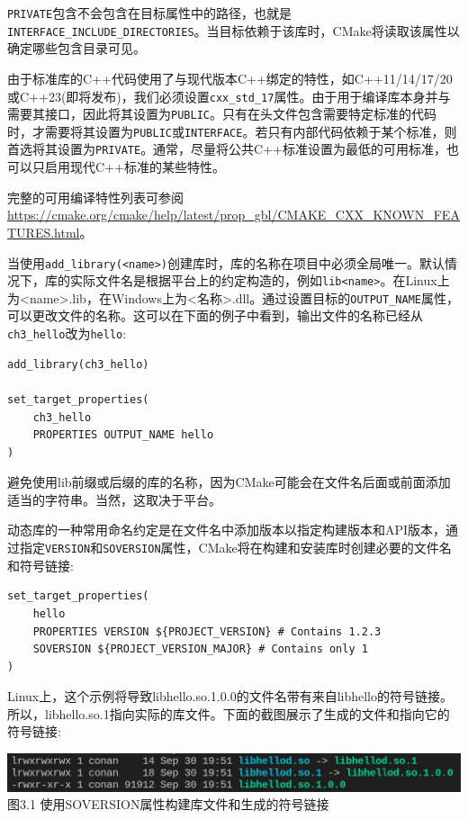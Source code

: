 \texttt{PRIVATE}包含不会包含在目标属性中的路径，也就是\texttt{INTERFACE\_INCLUDE\_DIRECTORIES}。当目标依赖于该库时，CMake将读取该属性以确定哪些包含目录可见。

由于标准库的C++代码使用了与现代版本C++绑定的特性，如C++11/14/17/20或C++23(即将发布)，我们必须设置\texttt{cxx\_std\_17}属性。由于用于编译库本身并与需要其接口，因此将其设置为\texttt{PUBLIC}。只有在头文件包含需要特定标准的代码时，才需要将其设置为\texttt{PUBLIC}或\texttt{INTERFACE}。若只有内部代码依赖于某个标准，则首选将其设置为\texttt{PRIVATE}。通常，尽量将公共C++标准设置为最低的可用标准，也可以只启用现代C++标准的某些特性。

完整的可用编译特性列表可参阅\url{https://cmake.org/cmake/help/latest/prop_gbl/CMAKE\_CXX\_KNOWN\_FEATURES.html}。


当使用\texttt{add\_library(<name>)}创建库时，库的名称在项目中必须全局唯一。默认情况下，库的实际文件名是根据平台上的约定构造的，例如\texttt{lib<name>}。在Linux上为<name>.lib，在Windows上为<名称>.dll。通过设置目标的\texttt{OUTPUT\_NAME}属性，可以更改文件的名称。这可以在下面的例子中看到，输出文件的名称已经从\texttt{ch3\_hello}改为\texttt{hello}:

\begin{lstlisting}[style=styleCMake]
add_library(ch3_hello)

set_target_properties(
	ch3_hello
	PROPERTIES OUTPUT_NAME hello
)
\end{lstlisting}

避免使用lib前缀或后缀的库的名称，因为CMake可能会在文件名后面或前面添加适当的字符串。当然，这取决于平台。

动态库的一种常用命名约定是在文件名中添加版本以指定构建版本和API版本，通过指定\texttt{VERSION}和\texttt{SOVERSION}属性，CMake将在构建和安装库时创建必要的文件名和符号链接:

\begin{lstlisting}[style=styleCMake]
set_target_properties(
	hello
	PROPERTIES VERSION ${PROJECT_VERSION} # Contains 1.2.3
	SOVERSION ${PROJECT_VERSION_MAJOR} # Contains only 1
)
\end{lstlisting}

Linux上，这个示例将导致libhello.so.1.0.0的文件名带有来自libhello的符号链接。所以，libhello.so.1指向实际的库文件。下面的截图展示了生成的文件和指向它的符号链接:

\begin{center}
\includegraphics[width=1.\textwidth]{content/1/chapter3/images/1.jpg}\\
图3.1  使用SOVERSION属性构建库文件和生成的符号链接
\end{center}


